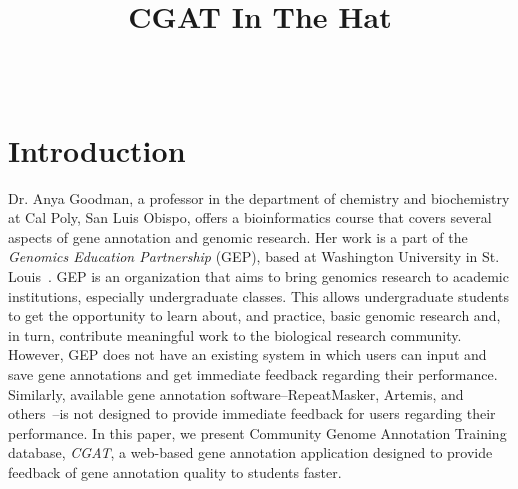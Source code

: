 \documentclass[10pt, conference, compsocconf]{IEEEtran}
\begin{document}
\title{CGAT In The Hat}


\author{
\\
}

\maketitle

\thispagestyle{empty}
\pagestyle{empty}

\section{Introduction}\label{sec:introduction}
Dr. Anya Goodman, a professor in the department of chemistry and biochemistry
at Cal Poly, San Luis Obispo, offers a bioinformatics course that covers
several aspects of gene annotation and genomic research. Her work is a part of
the \textit{Genomics Education Partnership} (GEP), based at Washington
University in St. Louis~\cite{gep}. GEP is an organization that aims to bring
genomics research to academic institutions, especially undergraduate classes.
This allows undergraduate students to get the opportunity to learn about, and
practice, basic genomic research and, in turn, contribute meaningful work to
the biological research community. However, GEP does not have an existing
system in which users can input and save gene annotations and get immediate
feedback regarding their performance. Similarly, available gene annotation
software--RepeatMasker, Artemis, and others~\cite{repeatmasker, artemis}--is
not designed to provide immediate feedback for users regarding their
performance. In this paper, we present Community Genome Annotation Training database,
\textit{CGAT}, a web-based gene annotation application designed to provide
feedback of gene annotation quality to students faster.
\end{document}
